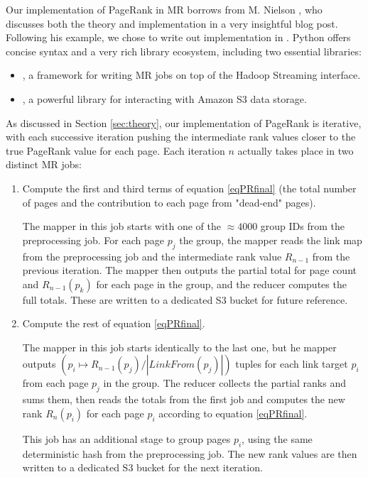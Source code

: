 Our implementation of PageRank in MR borrows from M. Nielson \cite{mnielsen}, who
discusses both the theory and implementation in a very insightful blog post.
Following his example, we chose to write out implementation in .
Python offers concise syntax and a very rich library ecosystem, including two
essential libraries: 
\begin{itemize}
\item {}, a framework for writing MR jobs on top of the Hadoop Streaming interface.
\item {}, a powerful library for interacting with Amazon S3 data storage.
\end{itemize}

As discussed in Section \ref{sec:theory}, our implementation of PageRank is 
iterative, with each successive iteration pushing the intermediate rank values 
closer to the true PageRank value for each page. 
Each iteration $n$ actually takes place in two distinct MR jobs:
\begin{enumerate}
\item Compute the first and third terms of equation \eqref{eqPRfinal} (the total 
    number of pages and the contribution to each page from "dead-end" pages).

    The mapper in this job starts with one of the $\approx4000$ group IDs from the 
    preprocessing job.  For each page $p_j$ the group, the mapper reads the 
    link map from the preprocessing job and the intermediate rank value 
    $R_{n-1}$ from the previous iteration.  The mapper then outputs the partial 
    total for page count and $R_{n-1}(p_k)$ for each page in the group, and the 
    reducer computes the full totals.  These are written to a dedicated S3 
    bucket for future reference.
    
\item Compute the rest of equation \eqref{eqPRfinal}.
    
    The mapper in this job starts identically to the last one, but he mapper 
    outputs $(p_i \mapsto R_{n-1}(p_j) / |LinkFrom(p_j)| )$ tuples for each 
    link target $p_i$ from each page $p_j$ in the group.  The reducer collects
    the partial ranks and sums them, then reads the totals from the first job
    and computes the new rank $R_n(p_i)$ for each page $p_i$ according to
    equation \eqref{eqPRfinal}.
    
    This job has an additional stage to group pages $p_i$, using the same 
    deterministic hash from the preprocessing job.  The new rank values are 
    then written to a dedicated S3 bucket for the next iteration.
\end{enumerate}

